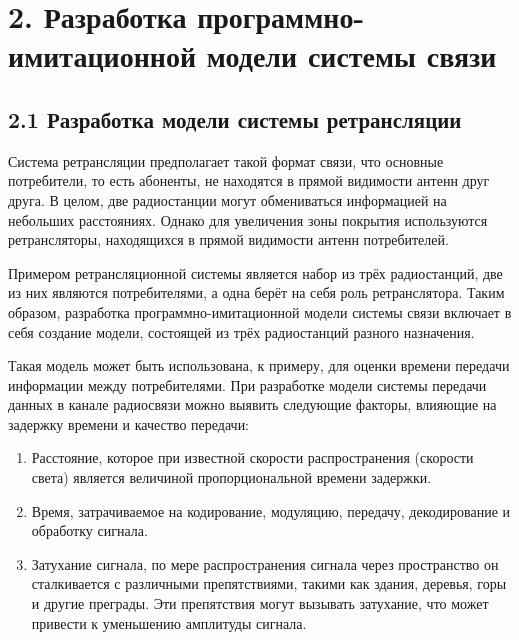 \chapter*{\centering\large{2. Разработка программно-имитационной модели системы связи}}
\label{sec:Chapter2} 


	
	
\section*{\large{2.1 Разработка модели системы ретрансляции}}
\begin{onehalfspace}

Система ретрансляции предполагает такой формат связи, что основные потребители, то есть абоненты, не находятся в прямой видимости антенн друг друга. В целом, две радиостанции могут обмениваться информацией на небольших расстояниях. Однако для увеличения зоны покрытия используются ретрансляторы, находящихся в прямой видимости антенн потребителей.

Примером ретрансляционной системы является набор из трёх радиостанций, две из них являются потребителями, а одна берёт на себя роль ретранслятора. Таким образом, разработка программно-имитационной модели системы связи включает в себя создание модели, состоящей из трёх радиостанций разного назначения. 

Такая модель может быть использована, к примеру, для оценки времени передачи информации между потребителями. При разработке модели системы передачи данных в канале радиосвязи можно выявить следующие факторы, влияющие на задержку времени и качество передачи:

\begin{enumerate} 

\item Расстояние, которое при известной скорости распространения (скорости света) является величиной пропорциональной времени задержки.

\item Время, затрачиваемое на кодирование, модуляцию, передачу, декодирование и обработку сигнала.

\item Затухание сигнала, по мере распространения сигнала через пространство он сталкивается с различными препятствиями, такими как здания, деревья, горы и другие преграды. Эти препятствия могут вызывать затухание, что может привести к уменьшению амплитуды сигнала.


\end{enumerate}
\end{onehalfspace}
